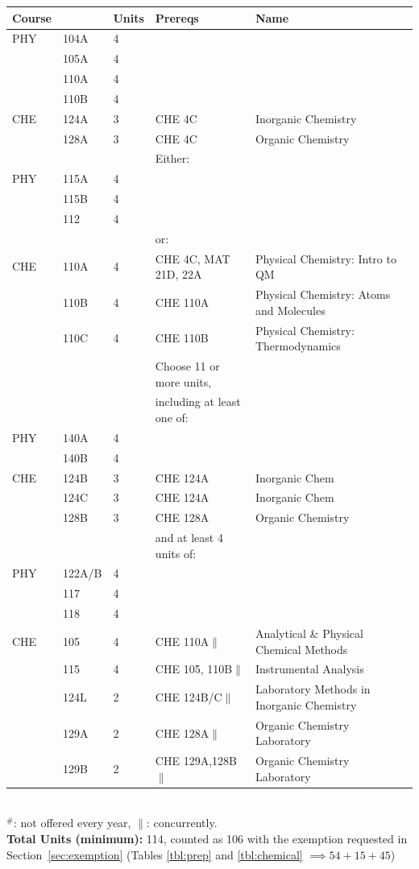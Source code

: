 \documentclass[12pt]{article}
\begin{document}
\begin{tabular}{|lllll|}
\hline
Course & & Units & Prereqs & Name \\
\hline
PHY & 104A    & 4 & & \\  
    & 105A    & 4 & & \\ 
    & 110A    & 4 & & \\ 
    & 110B    & 4 & &\\
CHE & 124A    & 3 & CHE 4C & Inorganic Chemistry\\
    & 128A    & 3 & CHE 4C & Organic Chemistry\\
\hline
\hline
     & & & Either: & \\
PHY  & 115A   & 4 & & \\
     & 115B   & 4 & & \\
     & 112    & 4 & & \\
\hline
     & & & or: & \\
CHE  & 110A   & 4 & CHE 4C, MAT 21D, 22A & Physical Chemistry: Intro to QM \\
     & 110B   & 4 & CHE 110A & Physical Chemistry: Atoms and Molecules \\
     & 110C   & 4 & CHE 110B & Physical Chemistry: Thermodynamics \\
\hline
\hline
    & & & Choose 11 or more units, & \\
    & & & including at least one of: & \\
PHY & 140A & 4 & & \\
    & 140B & 4 & & \\
CHE & 124B & 3 & CHE 124A & Inorganic Chem \\
    & 124C & 3 & CHE 124A & Inorganic Chem \\
    & 128B & 3 & CHE 128A & Organic Chemistry\\
\hline
    & & & and at least 4 units of: & \\
PHY & 122A/B & 4 & & \\
    & 117    & 4 & & \\
    & 118    & 4 & & \\
CHE & 105    & 4 & CHE 110A$\parallel$     & Analytical \& Physical Chemical Methods \\
    & 115    & 4 & CHE 105, 110B$\parallel$ & Instrumental Analysis \\
    & 124L   & 2 & CHE 124B/C$\parallel$    & Laboratory Methods in Inorganic Chemistry \\
    & 129A   & 2 & CHE 128A$\parallel$      & Organic Chemistry Laboratory \\
    & 129B   & 2 & CHE 129A,128B$\parallel$ & Organic Chemistry Laboratory \\
\hline
\end{tabular}\\
\noindent
$^\#$: not offered every year, $\parallel$: concurrently.\\
{\bf Total Units (minimum):} 114, counted as 106 with the exemption requested in Section~\ref{sec:exemption} (Tables \ref{tbl:prep} and \ref{tbl:chemical} $\implies 54+15+45$)\\
\end{document}
